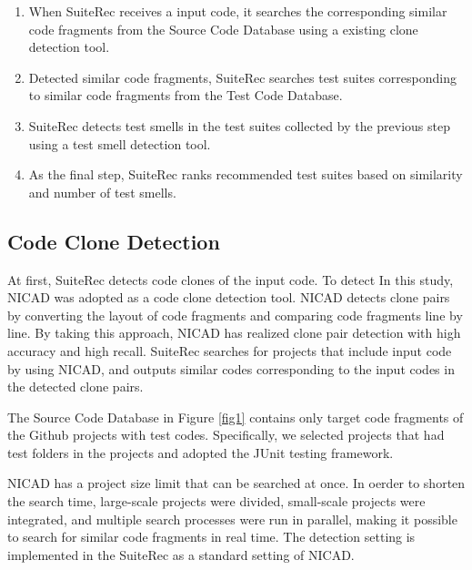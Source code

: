\documentclass[conference]{IEEEtran}
\begin{document}
\begin{enumerate}
\renewcommand{\labelenumi}{(\arabic{enumi})}
\item When SuiteRec receives a input code, it searches the corresponding similar code fragments from the Source Code Database using a existing clone detection tool.
\item Detected similar code fragments, SuiteRec searches test suites corresponding to similar code fragments from the Test  Code Database.
\item SuiteRec detects test smells in the test suites collected by the previous step using a test smell detection tool.
\item As the final step, SuiteRec ranks recommended test suites based on similarity and number of test smells.
\end{enumerate}


\subsection{Code Clone Detection}
At first, SuiteRec detects code clones of the input code. To detect In this study, NICAD\cite{b2} was adopted as a code clone detection tool. NICAD detects clone pairs by converting the layout of code fragments and comparing code fragments line by line. By taking this approach, NICAD has realized clone pair detection with high accuracy and high recall. SuiteRec searches for projects that include input code by using NICAD, and outputs similar codes corresponding to the input codes in the detected clone pairs.

The Source Code Database in Figure \ref{fig1} contains only target code fragments of the Github projects with test codes. Specifically, we selected projects that had  test folders in the projects and adopted the JUnit testing framework. 

NICAD has a project size limit that can be searched at once. In oerder to shorten the search time, large-scale projects were divided, small-scale projects were integrated, and multiple search processes were run in parallel, making it possible to search for similar code fragments in real time. The detection setting is implemented in the SuiteRec as a standard setting of NICAD.
\end{document}
